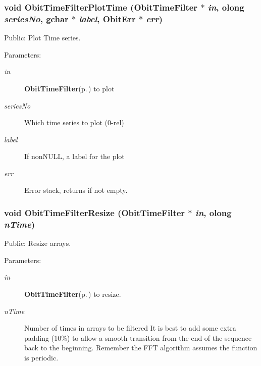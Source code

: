 \subsubsection{\setlength{\rightskip}{0pt plus 5cm}void Obit\-Time\-Filter\-Plot\-Time ({\bf Obit\-Time\-Filter} $\ast$ {\em in}, {\bf olong} {\em series\-No}, gchar $\ast$ {\em label}, {\bf Obit\-Err} $\ast$ {\em err})}\label{ObitTimeFilter_8h_a27}


Public: Plot Time series. 

\begin{Desc}
\item[Parameters:]
\begin{description}
\item[{\em in}]{\bf Obit\-Time\-Filter}{\rm (p.\,\pageref{structObitTimeFilter})} to plot \item[{\em series\-No}]Which time series to plot (0-rel) \item[{\em label}]If non\-NULL, a label for the plot \item[{\em err}]Error stack, returns if not empty. \end{description}
\end{Desc}
\subsubsection{\setlength{\rightskip}{0pt plus 5cm}void Obit\-Time\-Filter\-Resize ({\bf Obit\-Time\-Filter} $\ast$ {\em in}, {\bf olong} {\em n\-Time})}\label{ObitTimeFilter_8h_a19}


Public: Resize arrays. 

\begin{Desc}
\item[Parameters:]
\begin{description}
\item[{\em in}]{\bf Obit\-Time\-Filter}{\rm (p.\,\pageref{structObitTimeFilter})} to resize. \item[{\em n\-Time}]Number of times in arrays to be filtered It is best to add some extra padding (10\%) to allow a smooth transition from the end of the sequence back to the beginning. Remember the FFT algorithm assumes the function is periodic. \end{description}
\end{Desc}
